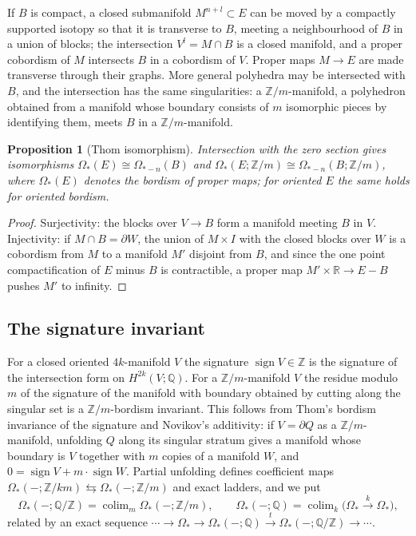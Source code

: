 \documentclass[11pt]{amsart}
\theoremstyle{plain}
\newtheorem{proposition}[theorem]{Proposition}
\theoremstyle{definition}
\numberwithin{equation}{section}
\newcommand{\Z}{\mathbb{Z}}
\newcommand{\Q}{\mathbb{Q}}
\newcommand{\R}{\mathbb{R}}
\DeclareMathOperator{\sign}{sign}
\DeclareMathOperator{\colim}{colim}
\begin{document}
If $B$ is compact, a closed submanifold $M^{n+l}\subset E$ can be moved by a compactly supported isotopy so that it is transverse to $B$, meeting a neighbourhood of $B$ in a union of blocks; the intersection $V^l=M\cap B$ is a closed manifold, and a proper cobordism of $M$ intersects $B$ in a cobordism of $V$.
Proper maps $M\to E$ are made transverse through their graphs.
More general polyhedra may be intersected with $B$, and the intersection has the same singularities: a $\Z/m$-manifold, a polyhedron obtained from a manifold whose boundary consists of $m$ isomorphic pieces by identifying them, meets $B$ in a $\Z/m$-manifold.

\begin{proposition}[Thom isomorphism]
Intersection with the zero section gives isomorphisms $\Omega_*(E)\cong\Omega_{*-n}(B)$ and $\Omega_*(E;\Z/m)\cong\Omega_{*-n}(B;\Z/m)$, where $\Omega_*(E)$ denotes the bordism of proper maps; for oriented $E$ the same holds for oriented bordism.
\end{proposition}

\begin{proof}
Surjectivity: the blocks over $V\to B$ form a manifold meeting $B$ in $V$.
Injectivity: if $M\cap B=\partial W$, the union of $M\times I$ with the closed blocks over $W$ is a cobordism from $M$ to a manifold $M'$ disjoint from $B$, and since the one point compactification of $E$ minus $B$ is contractible, a proper map $M'\times\R\to E-B$ pushes $M'$ to infinity.
\end{proof}

\subsection{The signature invariant}
For a closed oriented $4k$-manifold $V$ the signature $\sign V\in\Z$ is the signature of the intersection form on $H^{2k}(V;\Q)$.
For a $\Z/m$-manifold $V$ the residue modulo $m$ of the signature of the manifold with boundary obtained by cutting along the singular set is a $\Z/m$-bordism invariant.
This follows from Thom's bordism invariance of the signature and Novikov's additivity: if $V=\partial Q$ as a $\Z/m$-manifold, unfolding $Q$ along its singular stratum gives a manifold whose boundary is $V$ together with $m$ copies of a manifold $W$, and $0=\sign V+m\cdot\sign W$.
Partial unfolding defines coefficient maps $\Omega_*(-;\Z/km)\leftrightarrows\Omega_*(-;\Z/m)$ and exact ladders, and we put
\[
\Omega_*(-;\Q/\Z)=\colim_m\Omega_*(-;\Z/m),\qquad\Omega_*(-;\Q)=\colim_k\bigl(\Omega_*\xrightarrow{k}\Omega_*\bigr),
\]
related by an exact sequence $\cdots\to\Omega_*\to\Omega_*(-;\Q)\xrightarrow{t}\Omega_*(-;\Q/\Z)\to\cdots$.
\end{document}
